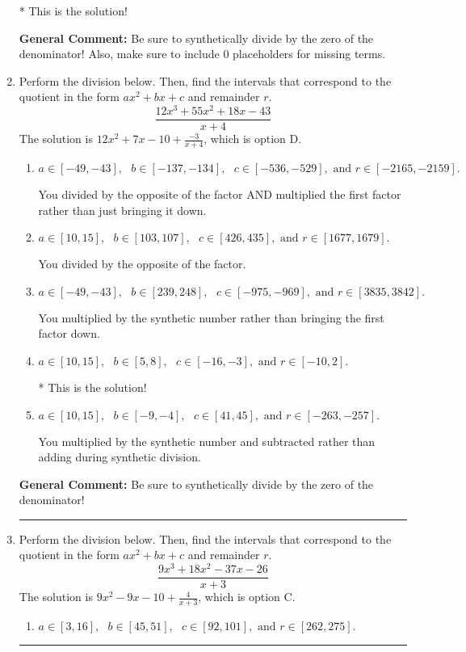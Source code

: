 \documentclass{extbook}[14pt]
\newcommand{\litem}[1]{\item #1

\rule{\textwidth}{0.4pt}}
\begin{document}
\begin{enumerate}
{\begin{enumerate}[label=\Alph*.]
* This is the solution!
\end{enumerate}

\textbf{General Comment:} Be sure to synthetically divide by the zero of the denominator! Also, make sure to include 0 placeholders for missing terms.
}
\litem{
Perform the division below. Then, find the intervals that correspond to the quotient in the form $ax^2+bx+c$ and remainder $r$.
\[ \frac{12x^{3} +55 x^{2} +18 x -43}{x + 4} \]The solution is \( 12x^{2} +7 x -10 + \frac{-3}{x + 4} \), which is option D.\begin{enumerate}[label=\Alph*.]
\item \( a \in [-49, -43], \text{   } b \in [-137, -134], \text{   } c \in [-536, -529], \text{   and   } r \in [-2165, -2159]. \)

 You divided by the opposite of the factor AND multiplied the first factor rather than just bringing it down.
\item \( a \in [10, 15], \text{   } b \in [103, 107], \text{   } c \in [426, 435], \text{   and   } r \in [1677, 1679]. \)

 You divided by the opposite of the factor.
\item \( a \in [-49, -43], \text{   } b \in [239, 248], \text{   } c \in [-975, -969], \text{   and   } r \in [3835, 3842]. \)

 You multiplied by the synthetic number rather than bringing the first factor down.
\item \( a \in [10, 15], \text{   } b \in [5, 8], \text{   } c \in [-16, -3], \text{   and   } r \in [-10, 2]. \)

* This is the solution!
\item \( a \in [10, 15], \text{   } b \in [-9, -4], \text{   } c \in [41, 45], \text{   and   } r \in [-263, -257]. \)

 You multiplied by the synthetic number and subtracted rather than adding during synthetic division.
\end{enumerate}

\textbf{General Comment:} Be sure to synthetically divide by the zero of the denominator!
}
\litem{
Perform the division below. Then, find the intervals that correspond to the quotient in the form $ax^2+bx+c$ and remainder $r$.
\[ \frac{9x^{3} +18 x^{2} -37 x -26}{x + 3} \]The solution is \( 9x^{2} -9 x -10 + \frac{4}{x + 3} \), which is option C.\begin{enumerate}[label=\Alph*.]
\item \( a \in [3, 16], \text{   } b \in [45, 51], \text{   } c \in [92, 101], \text{   and   } r \in [262, 275]. \)


\end{enumerate}}
\end{enumerate}
\end{document}
